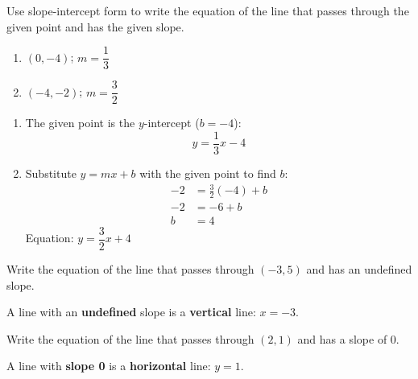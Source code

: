 \documentclass{ximera}
\begin{document}
\begin{problem}
Use slope-intercept form to write the equation of the line that passes through the given point and has the given slope.
\begin{enumerate}
  \item[(a)] $(0,-4)$; $m = \dfrac{1}{3}$
  \medskip
  \item[(b)] $(-4,-2)$; $m = \dfrac{3}{2}$
\end{enumerate}

\begin{solution}
\begin{enumerate}
  \item[(a)] The given point is the $y$-intercept ($b=-4$):
  $$y = \frac{1}{3}x - 4$$

  \item[(b)] Substitute $y=mx+b$ with the given point to find $b$:
  \begin{align*}
    -2 &= \frac{3}{2}(-4) + b\\
    -2 &= -6 + b\\
    b &= 4
  \end{align*}
  Equation: $y = \dfrac{3}{2}x + 4$
\end{enumerate}
\end{solution}
\end{problem}


\begin{problem}
Write the equation of the line that passes through $(-3,5)$ and has an undefined slope.

\begin{solution}
A line with an \textbf{undefined} slope is a \textbf{vertical} line: $x = -3$.
\end{solution}
\end{problem}


\begin{problem}
Write the equation of the line that passes through $(2,1)$ and has a slope of $0$.

\begin{solution}
A line with \textbf{slope 0} is a \textbf{horizontal} line: $y = 1$.
\end{solution}
\end{problem}
\end{document}

